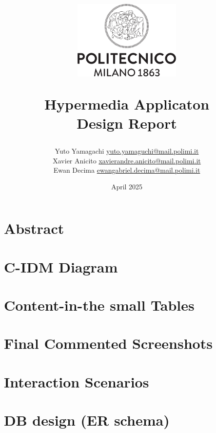 \documentclass{article}
\title{
        \vspace{-2cm}
        \begin{center}
                \includegraphics[width=0.4\textwidth]{asset/Logo_Politecnico_Milano.png} %
        \end{center}
        \vspace{1cm}
        \textbf{Hypermedia Applicaton \\ Design Report}
}
\author{Yuto Yamagachi \href{mailto:yuto.yamaguchi@mail.polimi.it}{yuto.yamaguchi@mail.polimi.it} \\
Xavier Anicito \href{mailto:xavierandre.anicito@mail.polimi.it}{xavierandre.anicito@mail.polimi.it} \\
Ewan Decima \href{mailto:ewangabriel.decima@mail.polimi.it}{ewangabriel.decima@mail.polimi.it}
}
\date{April 2025}
\begin{document}
\maketitle
\tableofcontents
\newpage

\section{Abstract}

\section{C-IDM Diagram}

\section{Content-in-the small Tables}

\section{Final Commented Screenshots}

\section{Interaction Scenarios}

\section{DB design (ER schema)}
\end{document}
